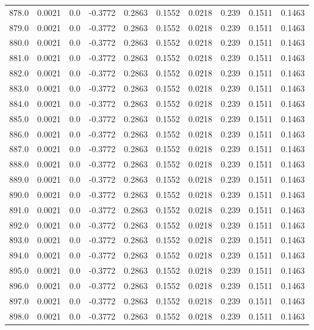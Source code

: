 \begin{longtable}{lrrrrrrrrr}
878.0 & 0.0021 & 0.0 & -0.3772 & 0.2863 & 0.1552 & 0.0218 & 0.239 & 0.1511 & 0.1463 \\
879.0 & 0.0021 & 0.0 & -0.3772 & 0.2863 & 0.1552 & 0.0218 & 0.239 & 0.1511 & 0.1463 \\
880.0 & 0.0021 & 0.0 & -0.3772 & 0.2863 & 0.1552 & 0.0218 & 0.239 & 0.1511 & 0.1463 \\
881.0 & 0.0021 & 0.0 & -0.3772 & 0.2863 & 0.1552 & 0.0218 & 0.239 & 0.1511 & 0.1463 \\
882.0 & 0.0021 & 0.0 & -0.3772 & 0.2863 & 0.1552 & 0.0218 & 0.239 & 0.1511 & 0.1463 \\
883.0 & 0.0021 & 0.0 & -0.3772 & 0.2863 & 0.1552 & 0.0218 & 0.239 & 0.1511 & 0.1463 \\
884.0 & 0.0021 & 0.0 & -0.3772 & 0.2863 & 0.1552 & 0.0218 & 0.239 & 0.1511 & 0.1463 \\
885.0 & 0.0021 & 0.0 & -0.3772 & 0.2863 & 0.1552 & 0.0218 & 0.239 & 0.1511 & 0.1463 \\
886.0 & 0.0021 & 0.0 & -0.3772 & 0.2863 & 0.1552 & 0.0218 & 0.239 & 0.1511 & 0.1463 \\
887.0 & 0.0021 & 0.0 & -0.3772 & 0.2863 & 0.1552 & 0.0218 & 0.239 & 0.1511 & 0.1463 \\
888.0 & 0.0021 & 0.0 & -0.3772 & 0.2863 & 0.1552 & 0.0218 & 0.239 & 0.1511 & 0.1463 \\
889.0 & 0.0021 & 0.0 & -0.3772 & 0.2863 & 0.1552 & 0.0218 & 0.239 & 0.1511 & 0.1463 \\
890.0 & 0.0021 & 0.0 & -0.3772 & 0.2863 & 0.1552 & 0.0218 & 0.239 & 0.1511 & 0.1463 \\
891.0 & 0.0021 & 0.0 & -0.3772 & 0.2863 & 0.1552 & 0.0218 & 0.239 & 0.1511 & 0.1463 \\
892.0 & 0.0021 & 0.0 & -0.3772 & 0.2863 & 0.1552 & 0.0218 & 0.239 & 0.1511 & 0.1463 \\
893.0 & 0.0021 & 0.0 & -0.3772 & 0.2863 & 0.1552 & 0.0218 & 0.239 & 0.1511 & 0.1463 \\
894.0 & 0.0021 & 0.0 & -0.3772 & 0.2863 & 0.1552 & 0.0218 & 0.239 & 0.1511 & 0.1463 \\
895.0 & 0.0021 & 0.0 & -0.3772 & 0.2863 & 0.1552 & 0.0218 & 0.239 & 0.1511 & 0.1463 \\
896.0 & 0.0021 & 0.0 & -0.3772 & 0.2863 & 0.1552 & 0.0218 & 0.239 & 0.1511 & 0.1463 \\
897.0 & 0.0021 & 0.0 & -0.3772 & 0.2863 & 0.1552 & 0.0218 & 0.239 & 0.1511 & 0.1463 \\
898.0 & 0.0021 & 0.0 & -0.3772 & 0.2863 & 0.1552 & 0.0218 & 0.239 & 0.1511 & 0.1463 \\

\end{longtable}
